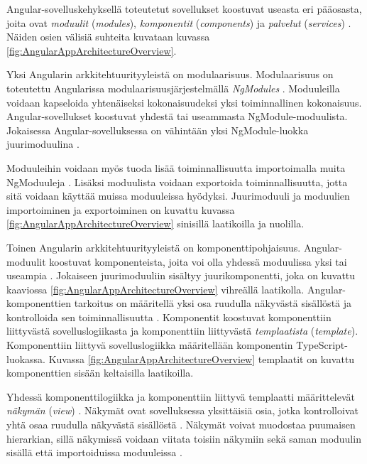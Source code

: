 \documentclass[finnish]{tktltiki2}
\theoremstyle{definition}
\theoremstyle{remark}
\numberwithin{figure}{section}
\begin{document}
Angular-sovelluskehyksellä toteutetut sovellukset koostuvat useasta eri pääosasta, joita ovat \textit{moduulit} (\textit{modules}), \textit{komponentit} (\textit{components}) ja \textit{palvelut} (\textit{services}) \cite{ArchitectureOverview}. Näiden osien välisiä suhteita kuvataan kuvassa \ref{fig:AngularAppArchitectureOverview}. 

Yksi Angularin arkkitehtuurityyleistä on modulaarisuus. Modulaarisuus on toteutettu Angularissa modulaarisuusjärjestelmällä \textit{NgModules} \cite{ArchitectureModules}. Moduuleilla voidaan kapseloida yhtenäiseksi kokonaisuudeksi yksi toiminnallinen kokonaisuus. Angular-sovellukset koostuvat yhdestä tai useammasta NgModule-moduulista. Jokaisessa Angular-sovelluksessa on vähintään yksi NgModule-luokka juurimoduulina \cite{ArchitectureModules}. 

Moduuleihin voidaan myös tuoda lisää toiminnallisuutta importoimalla muita NgModuuleja \cite{ArchitectureModules}. Lisäksi moduulista voidaan exportoida toiminnallisuutta, jotta sitä voidaan käyttää muissa moduuleissa hyödyksi. Juurimoduuli ja moduulien importoiminen ja exportoiminen on kuvattu kuvassa \ref{fig:AngularAppArchitectureOverview} sinisillä laatikoilla ja nuolilla.

Toinen Angularin arkkitehtuurityyleistä on komponenttipohjaisuus. Angular-moduulit koostuvat komponenteista, joita voi olla yhdessä moduulissa yksi tai useampia \cite{ArchitectureModules}. Jokaiseen juurimoduuliin sisältyy juurikomponentti, joka on kuvattu kaaviossa \ref{fig:AngularAppArchitectureOverview} vihreällä laatikolla. Angular-komponenttien tarkoitus on määritellä yksi osa ruudulla näkyvästä sisällöstä ja kontrolloida sen toiminnallisuutta \cite{ArchitectureComponents}. Komponentit koostuvat komponenttiin liittyvästä sovelluslogiikasta ja komponenttiin liittyvästä \textit{templaatista} (\textit{template}). Komponenttiin liittyvä sovelluslogiikka määritellään komponentin TypeScript-luokassa. Kuvassa \ref{fig:AngularAppArchitectureOverview} templaatit on kuvattu komponenttien sisään keltaisilla laatikoilla. 

Yhdessä komponenttilogiikka ja komponenttiin liittyvä templaatti määrittelevät \textit{näkymän} (\textit{view}) \cite{ArchitectureModules}. Näkymät ovat sovelluksessa yksittäisiä osia, jotka kontrolloivat yhtä osaa ruudulla näkyvästä sisällöstä \cite{ArchitectureComponents}. Näkymät voivat muodostaa puumaisen hierarkian, sillä näkymissä voidaan viitata toisiin näkymiin sekä saman moduulin sisällä että importoiduissa moduuleissa \cite{ArchitectureModules}. 
\end{document}
